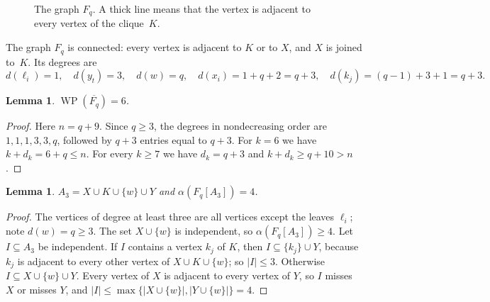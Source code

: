 \documentclass[11pt,a4paper]{article}
\newtheorem{lemma}[theorem]{Lemma}
\theoremstyle{definition}
\theoremstyle{remark}
\newcommand{\WP}{\operatorname{WP}}
\begin{document}
\begin{figure}[ht]
\centering
{}
\caption{The graph $F_q$. A thick line means that the vertex is adjacent to every vertex of the
clique~$K$.}
\label{fig:F}
\end{figure}

The graph $F_q$ is connected: every vertex is adjacent to $K$ or to $X$, and $X$ is joined
to~$K$. Its degrees are
\[
d(\ell_i)=1,\quad d(y_t)=3,\quad d(w)=q,\quad d(x_i)=1+q+2=q+3,\quad d(k_j)=(q-1)+3+1=q+3 .
\]

\begin{lemma}\label{lem:wp}
$\WP(\overline{F_q})=6$.
\end{lemma}

\begin{proof}
Here $n=q+9$. Since $q\ge 3$, the degrees in nondecreasing order are $1,1,1,3,3,q$, followed by
$q+3$ entries equal to $q+3$. For $k=6$ we have $k+d_k=6+q\le n$. For every $k\ge 7$ we have
$d_k=q+3$ and $k+d_k\ge q+10>n$.
\end{proof}

\begin{lemma}\label{lem:alpha}
$A_3=X\cup K\cup\{w\}\cup Y$ and $\alpha(F_q[A_3])=4$.
\end{lemma}

\begin{proof}
The vertices of degree at least three are all vertices except the leaves $\ell_i$; note
$d(w)=q\ge 3$. The set $X\cup\{w\}$ is independent, so $\alpha(F_q[A_3])\ge 4$. Let $I\subseteq A_3$
be independent. If $I$ contains a vertex $k_j$ of $K$, then $I\subseteq\{k_j\}\cup Y$, because $k_j$
is adjacent to every other vertex of $X\cup K\cup\{w\}$; so $|I|\le 3$. Otherwise
$I\subseteq X\cup\{w\}\cup Y$. Every vertex of $X$ is adjacent to every vertex of $Y$, so $I$ misses
$X$ or misses $Y$, and $|I|\le\max\{|X\cup\{w\}|,|Y\cup\{w\}|\}=4$.
\end{proof}
\end{document}
